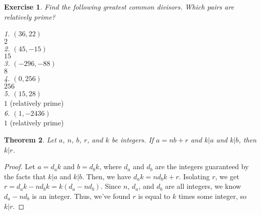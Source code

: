 \documentclass{article}
\newtheorem{thm}{Theorem}[section]
\newtheorem{ex}[thm]{Exercise}
\numberwithin{equation}{thm}
\begin{document}
\begin{ex} \label{1.31}
  Find the following greatest common divisors. Which pairs are relatively prime?
\end{ex}

\hspace*{5mm} \emph{1. $(36, 22)$} \\
\hspace*{15mm} $2$ \\

\hspace*{5mm} \emph{2. $(45, -15)$} \\
\hspace*{15mm} $15$ \\

\hspace*{5mm} \emph{3. $(-296, -88)$} \\
\hspace*{15mm} $8$ \\

\hspace*{5mm} \emph{4. $(0, 256)$} \\
\hspace*{15mm} $256$ \\

\hspace*{5mm} \emph{5. $(15, 28)$} \\
\hspace*{15mm} $1$ (relatively prime) \\

\hspace*{5mm} \emph{6. $(1, -2436)$} \\
\hspace*{15mm} $1$ (relatively prime) \\



\begin{thm} \label{1.32}
  Let $a$, $n$, $b$, $r$, and $k$ be integers. If $a = nb + r$ and $k|a$ and $k|b$, then $k|r$.
\end{thm}

\begin{proof}
  Let $a = d_ak$ and $b=d_bk$, where $d_a$ and $d_b$ are the integers guaranteed by the facts that $k|a$ and $k|b$.
  Then, we have $d_ak = nd_bk + r$. Isolating $r$, we get $r = d_ak - nd_bk = k(d_a - nd_b)$. Since $n$, $d_a$, and $d_b$ are all integers, we know $d_a - nd_b$ is an integer. Thus, we've found $r$ is equal to $k$ times some integer, so $k|r$.
\end{proof}
\end{document}
